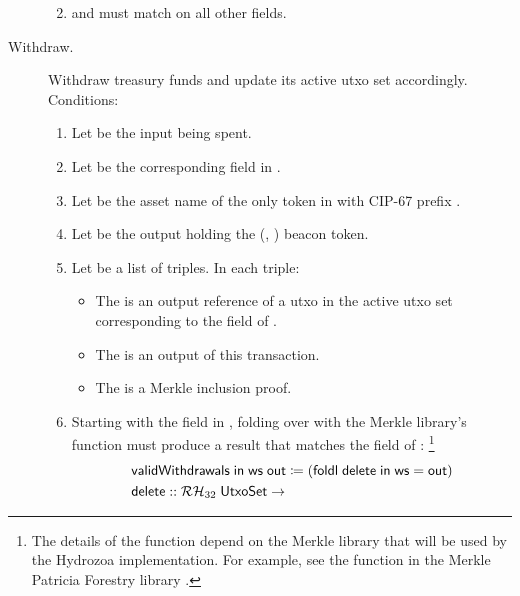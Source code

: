 \documentclass[../hydrozoa.tex]{subfiles}
\begin{document}
\begin{description}
\begin{enumerate}
\begin{enumerate}
        \end{enumerate}
      \item {} and  must match on all other fields.
    \end{enumerate}
  \item[Withdraw.] Withdraw treasury funds and update its active utxo set accordingly.
    Conditions:
    \begin{enumerate}
      \item Let  be the input being spent.
      \item Let  be the corresponding field in .
      \item Let  be the asset name of the only  token in  with CIP-67 prefix .
      \item Let  be the output holding the (, ) beacon token.
      \item Let  be a list of triples. In each triple:
        \begin{itemize}
          \item The  is an output reference of a utxo in the active utxo set corresponding to the  field of .
          \item The  is an output of this transaction.
          \item The  is a Merkle inclusion proof.
        \end{itemize}
      \item Starting with the  field in , folding over  with the Merkle library's  function must produce a result that matches the  field of :%
        \footnote{The details of the  function depend on the Merkle library that will be used by the Hydrozoa implementation. For example, see the  function in the Merkle Patricia Forestry library \citep{MatthiasBenkortMerklePatriciaForestry2024}.}
        \begin{equation*}
        \begin{split}
          &\T{validWithdrawals} \; \T{in} \; \T{ws} \; \T{out} \coloneq
            (\T{foldl} \; \T{delete} \; \T{in} \; \T{ws} = \T{out}) \\
          &\T{delete} ::
            \mathcal{RH}_{32} \; \T{UtxoSet} ->

\end{split}
\end{equation*}
\end{enumerate}
\end{description}
\end{document}

